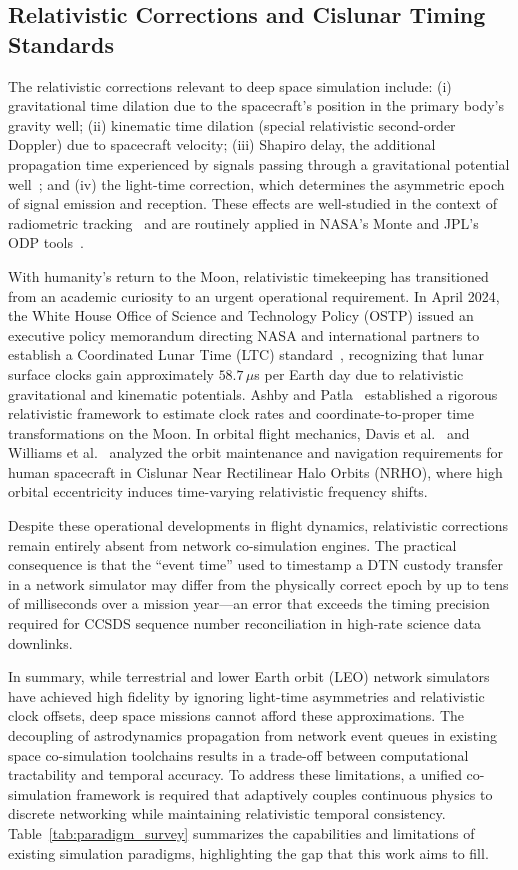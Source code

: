 \documentclass[a4paper,fleqn]{cas-sc}
\begin{document}
\subsection{Relativistic Corrections and Cislunar Timing Standards}
The relativistic corrections relevant to deep space simulation include: (i) gravitational time dilation due to the spacecraft's position in the primary body's gravity well; (ii) kinematic time dilation (special relativistic second-order Doppler) due to spacecraft velocity; (iii) Shapiro delay, the additional propagation time experienced by signals passing through a gravitational potential well~\cite{shapiro}; and (iv) the light-time correction, which determines the asymmetric epoch of signal emission and reception. These effects are well-studied in the context of radiometric tracking~\cite{moyer_formulation} and are routinely applied in NASA's Monte and JPL's ODP tools~\cite{monte}. 

With humanity's return to the Moon, relativistic timekeeping has transitioned from an academic curiosity to an urgent operational requirement. In April 2024, the White House Office of Science and Technology Policy (OSTP) issued an executive policy memorandum directing NASA and international partners to establish a Coordinated Lunar Time (LTC) standard~\cite{ostp_cislunar_time_2024}, recognizing that lunar surface clocks gain approximately $58.7\,\mu$s per Earth day due to relativistic gravitational and kinematic potentials. Ashby and Patla~\cite{ashby_cislunar_clock_2024} established a rigorous relativistic framework to estimate clock rates and coordinate-to-proper time transformations on the Moon. In orbital flight mechanics, Davis et al.~\cite{davis_nrho_nav_2017} and Williams et al.~\cite{williams_nrho} analyzed the orbit maintenance and navigation requirements for human spacecraft in Cislunar Near Rectilinear Halo Orbits (NRHO), where high orbital eccentricity induces time-varying relativistic frequency shifts. 

Despite these operational developments in flight dynamics, relativistic corrections remain entirely absent from network co-simulation engines. The practical consequence is that the ``event time'' used to timestamp a DTN custody transfer in a network simulator may differ from the physically correct epoch by up to tens of milliseconds over a mission year---an error that exceeds the timing precision required for CCSDS sequence number reconciliation in high-rate science data downlinks.

In summary, while terrestrial and lower Earth orbit (LEO) network simulators have achieved high fidelity by ignoring light-time asymmetries and relativistic clock offsets, deep space missions cannot afford these approximations. The decoupling of astrodynamics propagation from network event queues in existing space co-simulation toolchains results in a trade-off between computational tractability and temporal accuracy. To address these limitations, a unified co-simulation framework is required that adaptively couples continuous physics to discrete networking while maintaining relativistic temporal consistency. Table~\ref{tab:paradigm_survey} summarizes the capabilities and limitations of existing simulation paradigms, highlighting the gap that this work aims to fill.
\end{document}
